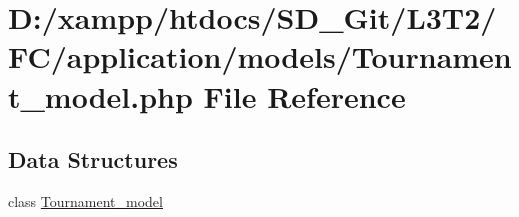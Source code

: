 \hypertarget{application_2models_2_tournament__model_8php}{}\section{D\+:/xampp/htdocs/\+S\+D\+\_\+\+Git/\+L3\+T2/\+F\+C/application/models/\+Tournament\+\_\+model.php File Reference}
\label{application_2models_2_tournament__model_8php}
\subsection*{Data Structures}
\begin{DoxyCompactItemize}
\item 
class \hyperlink{class_tournament__model}{Tournament\+\_\+model}
\end{DoxyCompactItemize}
